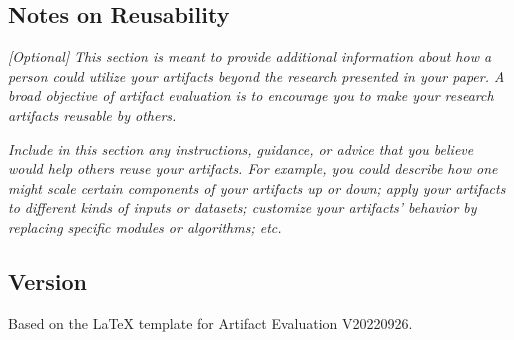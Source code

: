 \subsection{Notes on Reusability}

\emph{[Optional]}
%
\emph{This section is meant to provide additional information about
how a person could utilize your artifacts beyond the research
presented in your paper.  A broad objective of artifact evaluation is
to encourage you to make your research artifacts reusable by others.}

\emph{Include in this section any instructions, guidance, or advice
that you believe would help others reuse your artifacts.  For example,
you could describe how one might scale certain components of your
artifacts up or down; apply your artifacts to different kinds of
inputs or datasets; customize your artifacts' behavior by replacing
specific modules or algorithms; etc.}


\subsection{Version}
Based on the LaTeX template for Artifact Evaluation V20220926.







